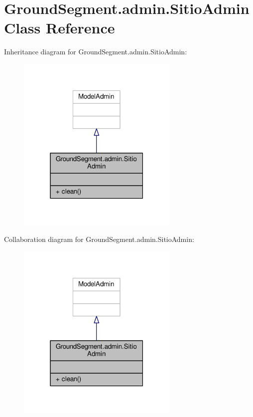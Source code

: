 \hypertarget{class_ground_segment_1_1admin_1_1_sitio_admin}{}\section{Ground\+Segment.\+admin.\+Sitio\+Admin Class Reference}
\label{class_ground_segment_1_1admin_1_1_sitio_admin}


Inheritance diagram for Ground\+Segment.\+admin.\+Sitio\+Admin\+:\nopagebreak
\begin{figure}[H]
\begin{center}
\leavevmode
\includegraphics[width=219pt]{class_ground_segment_1_1admin_1_1_sitio_admin__inherit__graph}
\end{center}
\end{figure}


Collaboration diagram for Ground\+Segment.\+admin.\+Sitio\+Admin\+:\nopagebreak
\begin{figure}[H]
\begin{center}
\leavevmode
\includegraphics[width=219pt]{class_ground_segment_1_1admin_1_1_sitio_admin__coll__graph}
\end{center}
\end{figure}
